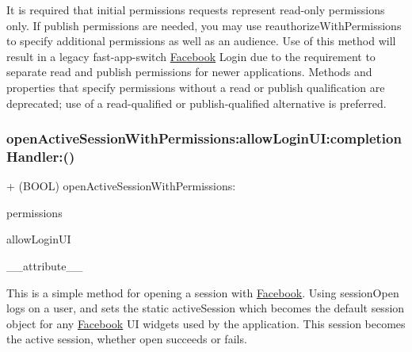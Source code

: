 It is required that initial permissions requests represent read-\/only permissions only. If publish permissions are needed, you may use reauthorize\+With\+Permissions to specify additional permissions as well as an audience. Use of this method will result in a legacy fast-\/app-\/switch \hyperlink{interfaceFacebook}{Facebook} Login due to the requirement to separate read and publish permissions for newer applications. Methods and properties that specify permissions without a read or publish qualification are deprecated; use of a read-\/qualified or publish-\/qualified alternative is preferred. \mbox{\label{interfaceFBSession_ac90957d41f538f96b5d8c9087ad3ad2d}} 
\subsubsection{\texorpdfstring{open\+Active\+Session\+With\+Permissions\+:allow\+Login\+U\+I\+:completion\+Handler\+:()}{openActiveSessionWithPermissions:allowLoginUI:completionHandler:()}\hspace{0.1cm}{\footnotesize\ttfamily [2/5]}}
{\footnotesize\ttfamily + (B\+O\+OL) open\+Active\+Session\+With\+Permissions\+: \begin{DoxyParamCaption}\item[{(N\+S\+Array $\ast$)}]{permissions }\item[{allowLoginUI:(B\+O\+OL)}]{allow\+Login\+UI }\item[{completionHandler:((deprecated))}]{\+\_\+\+\_\+attribute\+\_\+\+\_\+ }\end{DoxyParamCaption}}

This is a simple method for opening a session with \hyperlink{interfaceFacebook}{Facebook}. Using session\+Open logs on a user, and sets the static active\+Session which becomes the default session object for any \hyperlink{interfaceFacebook}{Facebook} UI widgets used by the application. This session becomes the active session, whether open succeeds or fails.


